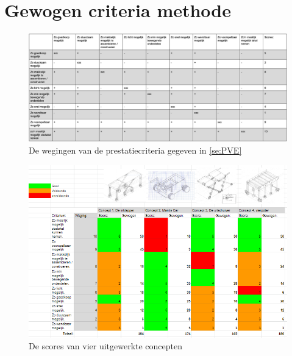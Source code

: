 \chapter{Gewogen criteria methode}
\label{ch:gewogen_criteria_methode}
\newpage{}

\begin{figure}[H]
    \includegraphics[width=180mm, angle = 270]{06_bijlage_B/wegingen.png}
    \caption{De wegingen van de prestatiecriteria gegeven in \cref{se:PVE}}
    \label{fig:wegingen}
\end{figure}

\begin{figure}[H]
    \includegraphics[width=180mm, angle = 270]{gegeven_scores_goed.PNG}
    \caption{De  scores van vier uitgewerkte concepten}
    \label{fig:conceptscores}
\end{figure}


